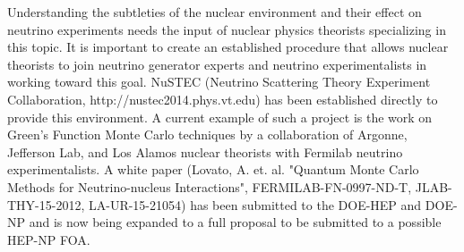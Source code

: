 

Understanding the subtleties of the nuclear environment and their
effect on neutrino experiments needs the input of nuclear physics
theorists specializing in this topic. It is important to create an
established procedure that allows nuclear theorists to join neutrino
generator experts and neutrino experimentalists in working toward this
goal. NuSTEC (Neutrino Scattering Theory Experiment Collaboration,
http://nustec2014.phys.vt.edu) has been established directly to
provide this environment.
A current example of such a project is the work on Green's Function
Monte Carlo techniques by a collaboration of Argonne, Jefferson Lab,
and Los Alamos nuclear theorists with Fermilab neutrino
experimentalists.  A white paper (Lovato, A. et. al. "Quantum Monte
Carlo Methods for Neutrino-nucleus Interactions",
FERMILAB-FN-0997-ND-T, JLAB-THY-15-2012, LA-UR-15-21054) has been
submitted to the DOE-HEP and DOE-NP and is now being expanded to a
full proposal to be submitted to a possible HEP-NP FOA.

